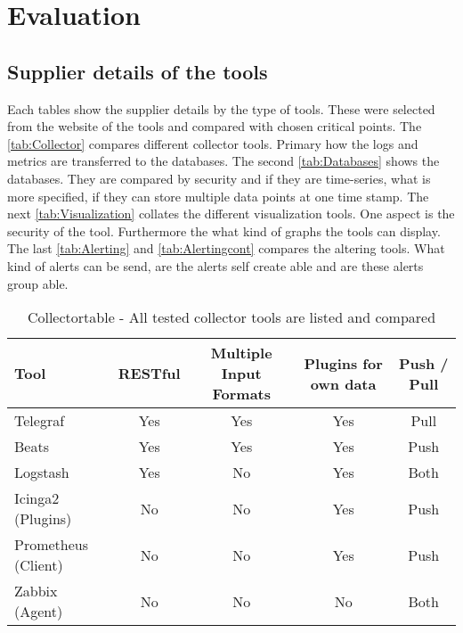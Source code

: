 \chapter{Evaluation} %
\section{Supplier details of the tools}
Each tables show the supplier details by the type of tools. These were selected from the website of the tools and compared with chosen critical points. The \vref{tab:Collector} compares different collector tools. Primary how the logs and metrics are transferred to the databases. The second \cref{tab:Databases} shows the databases. They are compared by security and if they are time-series, what is more specified, if they can store multiple data points at one time stamp. The next \cref{tab:Visualization} collates the different visualization tools. One aspect is the security of the tool. Furthermore the what kind of graphs the tools can display. The last \cref{tab:Alerting} and \cref{tab:Alertingcont} compares the altering tools. What kind of alerts can be send, are the alerts self create able and are these alerts group able. 


\begin{table}
\centering
\label{tab:Collector}
\begin{tabular}{p{3cm}cccc}
\hline
Tool & RESTful                     & Multiple Input Formats      & Plugins for own data        & Push / Pull                 \\
\hline
Telegraf                     & Yes & Yes                         & Yes                         & Pull                         \\
Beats                        & Yes                         & Yes & Yes                         & Push                         \\
Logstash                     & Yes                         & No                          & Yes & Both                         \\
Icinga2 (Plugins)            & No                          & No                          & Yes                         & Push \\
Prometheus (Client)          & No                          & No                          & Yes                         & Push \\
Zabbix (Agent)               & No                          & No                          & No  & Both \\
\hline                        
\end{tabular}
\caption{Collectortable - All tested collector tools are listed and compared}
\end{table}



